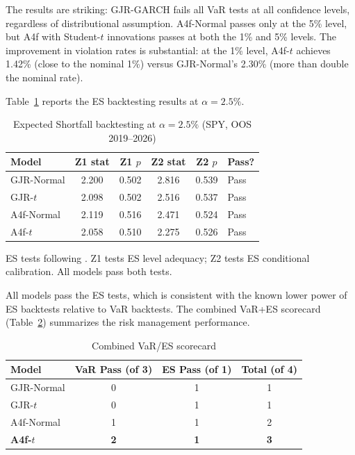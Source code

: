 \documentclass[12pt,a4paper]{article}
\begin{document}
The results are striking: GJR-GARCH fails all VaR tests at all confidence levels, regardless of distributional assumption. A4f-Normal passes only at the 5\% level, but A4f with Student-$t$ innovations passes at both the 1\% and 5\% levels. The improvement in violation rates is substantial: at the 1\% level, A4f-$t$ achieves 1.42\% (close to the nominal 1\%) versus GJR-Normal's 2.30\% (more than double the nominal rate).

Table~\ref{tab:es_results} reports the ES backtesting results at $\alpha = 2.5\%$.

\begin{table}[H]
\centering
\caption{Expected Shortfall backtesting at $\alpha = 2.5\%$ (SPY, OOS 2019--2026)}
\label{tab:es_results}
\begin{threeparttable}
\begin{tabular}{@{}lccccl@{}}
\toprule
Model & Z1 stat & Z1 $p$ & Z2 stat & Z2 $p$ & Pass? \\
\midrule
GJR-Normal & 2.200 & 0.502 & 2.816 & 0.539 & Pass \\
GJR-$t$ & 2.098 & 0.502 & 2.516 & 0.537 & Pass \\
A4f-Normal & 2.119 & 0.516 & 2.471 & 0.524 & Pass \\
A4f-$t$ & 2.058 & 0.510 & 2.275 & 0.526 & Pass \\
\bottomrule
\end{tabular}
\begin{tablenotes}
\footnotesize
\item ES tests following \citet{acerbi2014}. Z1 tests ES level adequacy; Z2 tests ES conditional calibration. All models pass both tests.
\end{tablenotes}
\end{threeparttable}
\end{table}

All models pass the ES tests, which is consistent with the known lower power of ES backtests relative to VaR backtests. The combined VaR+ES scorecard (Table~\ref{tab:scorecard}) summarizes the risk management performance.

\begin{table}[H]
\centering
\caption{Combined VaR/ES scorecard}
\label{tab:scorecard}
\begin{tabular}{@{}lccc@{}}
\toprule
Model & VaR Pass (of 3) & ES Pass (of 1) & Total (of 4) \\
\midrule
GJR-Normal & 0 & 1 & 1 \\
GJR-$t$ & 0 & 1 & 1 \\
A4f-Normal & 1 & 1 & 2 \\
\textbf{A4f-$t$} & \textbf{2} & \textbf{1} & \textbf{3} \\
\bottomrule
\end{tabular}
\end{table}
\end{document}
